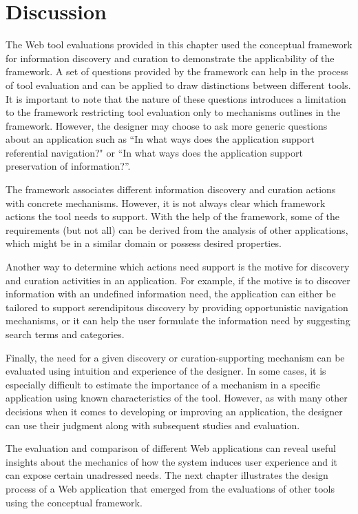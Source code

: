 {\section{Discussion}
The Web tool evaluations provided in this chapter used the conceptual framework for information discovery and curation to demonstrate the applicability of the framework. A set of questions provided by the framework can help in the process of tool evaluation and can be applied to draw distinctions between different tools. It is important to note that the nature of these questions introduces a limitation to the framework restricting tool evaluation only to mechanisms outlines in the framework. However, the designer  may choose to ask more generic questions about an application such as ``In what ways does the application support referential navigation?" or ``In what ways does the application support preservation of information?''.

The framework associates different information discovery and curation actions with concrete mechanisms. However, it is not always clear which framework actions the tool needs to support. With the help of the framework, some of the requirements (but not all) can be derived from the analysis of other applications, which might be in a similar domain or possess desired properties. 

Another way to determine which actions need support is the motive for discovery and curation activities in an application. For example, if the motive is to discover information with an undefined information need, the application  can either be tailored to support serendipitous discovery by providing opportunistic navigation mechanisms, or it can help the user formulate the information need by suggesting search terms and categories.

Finally, the need for a given discovery or curation-supporting mechanism can be evaluated using intuition and experience of the designer. In some cases, it is especially difficult to estimate the importance of a mechanism in a specific application using known characteristics of the tool. However, as with many other decisions when it comes to developing or improving an application, the designer can use their judgment along with subsequent studies and evaluation. 

The evaluation and comparison of different Web applications can reveal useful insights about the mechanics of how the system induces user experience and it can expose certain unadressed needs. The next chapter illustrates the design process of a Web application that emerged from the evaluations of other tools using the conceptual framework. 

} %